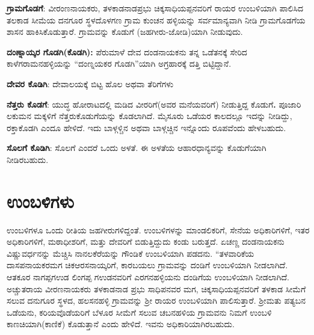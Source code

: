 \textbf{ಗ್ರಾಮಗೊಡಗೆ}: ವೀರಂಣನಾಯಕರು, ತಳಕಾಡನಾಡಪ್ರಭು ಚಿಕ್ಕಸಾಧಿಯಪ್ಪನವರಿಗೆ ರಾಯರ ಉಂಬಳಿಯಾಗಿ ಪಾಲಿಸಿದ ತಲಕಾಡ ಸೀಮೆಯ ದನಗೂರ ಸ್ಥಳದೊಳಗಣ ಗ್ರಾಮ ಕುಂಚನ ಹಳ್ಳಿಯನ್ನು ಸರ್ವಮಾನ್ಯವಾಗಿ ನೀಡಿ ಗ್ರಾಮ\-ಗೊಡಗೆಯ ಶಾಸನ ಹಾಕಿಸಿಕೊಡುತ್ತಾರೆ. ಗ್ರಾಮವನ್ನು ಕೊಡುಗೆ (ಜಹಗೀರು-ಜೋಡಿ)ಯಾಗಿ ನೀಡುವುದು.

\textbf{ದಂಣ್ನಾಯ್ಕರ ಗೊಡಗಿ(ಕೊಡಗಿ):} ಪೆರುಮಾಳೆ ದೇವ ದಂಡನಾಯಕನು ತನ್ನ ಒಡೆತನಕ್ಕೆ ಸೇರಿದ ಕಾಳೆಗರಾಮನಹಳ್ಳಿ\-ಯನ್ನು “ದಂಣ್ನಯಕರ ಗೊಡಗಿ”ಯಾಗಿ ಅಗ್ರಹಾರಕ್ಕೆ ದತ್ತಿ ಬಿಟ್ಟಿದ್ದಾನೆ.

\textbf{ದೇವರ ಕೊಡಿಗಿ}: ದೇವಾಲಯಕ್ಕೆ ಬಿಟ್ಟ ಹೊಲ ಅಥವಾ ತೆರಿಗೆಗಳು

\textbf{ನೆತ್ತರು ಕೊಡಗೆ}: ಯುದ್ಧ ಹೋರಾಟದಲ್ಲಿ ಮಡಿದ ವೀರರಿಗೆ(ಅವರ ಮನೆಯವರಿಗೆ) ನೀಡುತ್ತಿದ್ದ ಕೊಡುಗೆ\textbf{.\general{\break } }ಪೂಜಾರಿ ಲಕುಮನ ಮಕ್ಕಳಿಗೆ ನೆತ್ತರುಕೊಡುಗೆಯನ್ನು ಕೊಡಲಾಗಿದೆ. ಮೈಸೂರು ಒಡೆಯರ ಕಾಲದಲ್ಲೂ ಇದನ್ನು ನೀಡಿದ್ದು, ರಕ್ತಾಕೊಡಗಿ ಎಂದೂ ಹೇಳಿದೆ. ಇದು ಬಾಳ್ಗಳ್ಚಿನ ಅಥವಾ ಬಾಳ್ಗಚ್ಚಿನ ಇನ್ನೊಂದು ರೂಪವೆಂದು ಹೇಳಬಹುದು.

\textbf{ಸೊಲಗೆ ಕೊಡಿಗಿ}: ಸೊಲಗೆ ಎಂದರೆ ಒಂದು ಅಳತೆ. ಈ ಅಳತೆಯ ಆಹಾರಧಾನ್ಯವನ್ನು ಕೊಡುಗೆಯಾಗಿ ನೀಡಿರಬಹುದು.

\section*{ಉಂಬಳಿಗಳು}

ಉಂಬಳಿಗಳೂ ಒಂದು ರೀತಿಯ ಜಹಗೀರುಗಳಿದ್ದಂತೆ. ಉಂಬಳಿಗಳನ್ನು ಮಾಂಡಲಿಕರಿಗೆ, ಸೇನೆಯ ಅಧಿಕಾರಿಗಳಿಗೆ, ಇತರ ಅಧಿಕಾರಿಗಳಿಗೆ, ಮಠಾಧೀಶರಿಗೆ, ಮತ್ತು ದೇವರಿಗೆ ಬಿಡುತ್ತಿದ್ದುದು ಕಂಡು ಬರುತ್ತದೆ. ಏಚಣ್ಣ ದಂಡನಾಯಕನು ವಿಷ್ಣುವರ್ಧನನ್ನು ಮೆಚ್ಚಿಸಿ ನಾನಲಕೆರೆಯನ್ನು ಗೌಂಡಿಕೆ ಉಂಬಳಿಯಾಗಿ ಪಡದನು. “ತಳವಾರಿಕೆಯ ದಾಸಪನಾಯಕರ\break ಮಗ ಚಿಕಆರಸನಾಯ್ಕರಿಗೆ, ಕಾರಬಯಲು ಗ್ರಾಮವನ್ನು ದಂಡಿಗೆ ಉಂಬಳಿಯಾಗಿ ನೀಡಲಾಗಿದೆ. ಆತಕೂರ ನಾಗಪ್ಪಗಉಡ ಲಿಂಗಪ್ಪ ಗಉಡನವರಿಗೆ ಎರಗನಹಳ್ಳಿಯನು ದಂಡಿಗೆಯ ಉಂಬಳಿಯಾಗಿ ನೀಡಲಾಗಿದೆ. ಅಚ್ಚುತರಾಯ ವೀರಣನಾಯಕರು ತಳಕಾಡನಾಡ ಪ್ರಭು ಸಾಧಿಪನವರ ಮಗ, ಚಿಕ್ಕಸಾಧಿಯಪ್ಪನವರಿಗೆ ತಳಕಾಡ ಸೀಮೆಗೆ ಸಲುವ ದನುಗೂರ ಸ್ಥಳದ, ಹಲಸನಹಳ್ಳಿ ಗ್ರಾಮವನ್ನು ಶ‍್ರೀ ರಾಯರ ಉಂಬಳಿಯಾಗಿ ಪಾಲಿಸುತ್ತಾರೆ. ಶ‍್ರೀಮತು ಪತ್ಯಬನ ಒಡೆಯನು, ಕರಿಯವೊಡೆಯರಿಗೆ ಬೆಳೂರ ಸೀಮೆಗೆ ಸಲುವ ಚಬನಹಳಿಯ ಗ್ರಾಮವನು ನಿಮಗೆ ಉಂಬಳಿ ಕಾಣಚಿಯಾಗಿ(ಕಾಣಿಕೆ) ಕೊಡುತ್ತಾನೆ ಎಂದು ಹೇಳಿದೆ. ಇವನು ಅಧಿಕಾರಿಯಾಗಿರಬಹುದು.

